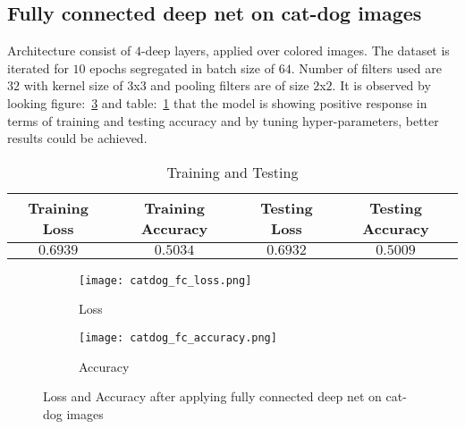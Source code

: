 \documentclass[12pt,a4paper,titlepage]{report}
\begin{document}
\subsection{Fully connected deep net on cat-dog images}
Architecture consist of $4$-deep layers, applied over colored images. The dataset is iterated for $10$ epochs segregated in batch size of $64$. Number of filters used are $32$ with kernel size of $3$x$3$ and pooling filters are of size $2$x$2$. It is observed by looking figure:~\ref{fig: Image8} and table:~\ref{tab: Table-14} that the model is showing positive response in terms of training and testing accuracy and by tuning hyper-parameters, better results could be achieved.
\vspace{20pt}
\begin{table}[H]
\centering
\caption{Training and Testing}
\label{tab: Table-14}
\begin{tabular}{c c c c}
\hline
\textbf{Training Loss} & \textbf{Training Accuracy} & \textbf{Testing Loss} & \textbf{Testing Accuracy}\\
\hline
$0.6939$ & $0.5034$ & $0.6932$ & $0.5009$\\
\hline
\end{tabular}
\end{table}

\begin{figure}[H]
\centering
\begin{subfigure}[h]{0.45\linewidth}
\texttt{[image: catdog\_fc\_loss.png]}
\caption{Loss}
\label{fig:a}
\end{subfigure}
\quad
\begin{subfigure}[h]{0.45\linewidth}
\texttt{[image: catdog\_fc\_accuracy.png]}
\caption{Accuracy}
\label{fig:b}
\end{subfigure}
\caption{Loss and Accuracy after applying fully connected deep net on cat-dog images}
\label{fig: Image8}
\end{figure}
\end{document}

